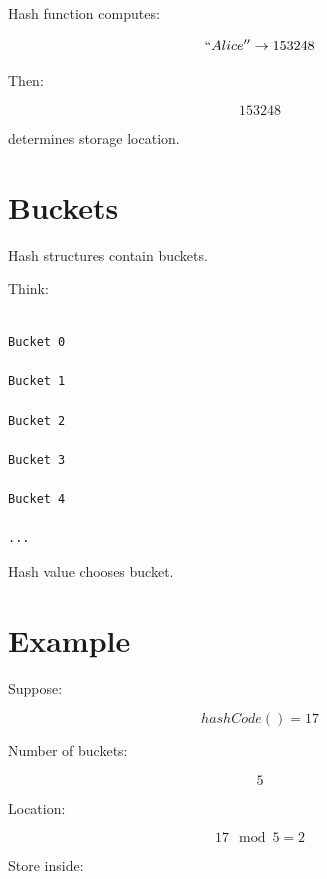 \documentclass[11pt,a4paper]{book}
\begin{document}
Hash function computes:

\[
``Alice''
\rightarrow
153248
\]


Then:

\[
153248
\]

determines storage location.


\section{Buckets}

Hash structures contain buckets.


Think:

\begin{verbatim}

Bucket 0

Bucket 1

Bucket 2

Bucket 3

Bucket 4

...

\end{verbatim}


Hash value chooses bucket.


\section{Example}

Suppose:

\[
hashCode() = 17
\]


Number of buckets:

\[
5
\]


Location:

\[
17 \mod 5
=
2
\]


Store inside:
\end{document}
